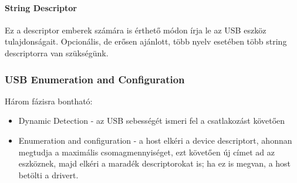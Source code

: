 \paragraph{String Descriptor}

Ez a descriptor emberek számára is érthető módon írja le az USB eszköz tulajdonságait. Opcionális, de erősen ajánlott, több nyelv esetében több string descriptorra van szükségünk.

\subsubsection*{USB Enumeration and Configuration}

Három fázisra bontható:

\begin{itemize}
	\item Dynamic Detection - az USB sebességét ismeri fel a csatlakozást követően
	\item Enumeration and configuration - a host elkéri a device descriptort, ahonnan megtudja a maximális csomagmennyiséget, ezt követően új címet ad az eszköznek, majd elkéri a maradék descriptorokat is; ha ez is megvan, a host betölti a drivert.
\end{itemize}

